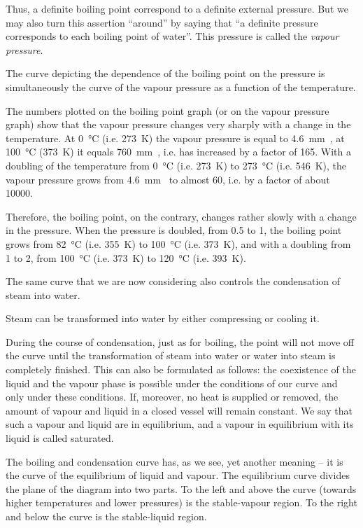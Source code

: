Thus, a definite boiling point correspond to a definite external pressure. But we may also turn this assertion ``around'' by saying that ``a definite pressure corresponds to each boiling point of water''. This pressure is called the \emph{vapour pressure}.

The curve depicting the dependence of the boiling point on the pressure is simultaneously the curve of the vapour pressure as a function of the temperature.

The numbers plotted on the boiling point graph (or on the vapour pressure graph) show that the vapour pressure changes very sharply with a change in the temperature. At \SI{0}{\celsius} (i.e. \SI{273}{\kelvin}) the vapour pressure is equal to \SI{4.6}{\milli\meter\mercury}, at \SI{100}{\celsius} (\SI{373}{\kelvin}) it equals \SI{760}{\milli\meter\mercury}, i.e. has increased by a factor of 165. With a doubling of the temperature from \SI{0}{\celsius} (i.e. \SI{273}{\kelvin}) to \SI{273}{\celsius} (i.e. \SI{546}{\kelvin}), the vapour pressure grows from \SI{4.6}{\milli\meter\mercury}  to almost \SI{60}{\atmos}, i.e. by a factor of about \num{10000}.

Therefore, the boiling point, on the contrary, changes rather slowly with a change in the pressure. When the pressure is doubled, from 0.5 to \SI{1}{\atmos}, the boiling point grows from \SI{82}{\celsius} (i.e. \SI{355}{\kelvin}) to \SI{100}{\celsius} (i.e. \SI{373}{\kelvin}), and with a doubling from 1 to \SI{2}{\atmos}, from \SI{100}{\celsius} (i.e. \SI{373}{\kelvin}) to \SI{120}{\celsius} (i.e. \SI{393}{\kelvin}).

The same curve that we are now considering also con­trols the condensation of steam into water.

Steam can be transformed into water by either compress­ing or cooling it.

During the course of condensation, just as for boiling, the point will not move off the curve until the transfor­mation of steam into water or water into steam is com­pletely finished. This can also be formulated as follows: the coexistence of the liquid and the vapour phase is pos­sible under the conditions of our curve and only under these conditions. If, moreover, no heat is supplied or removed, the amount of vapour and liquid in a closed vessel will remain constant. We say that such a vapour and liquid are in equilibrium, and a vapour in equilibrium with its liquid is called saturated.

The boiling and condensation curve has, as we see, yet another meaning -- it is the curve of the equilibrium of liquid and vapour. The equilibrium curve divides the plane of the diagram into two parts. To the left and above the curve (towards higher temperatures and lower pres­sures) is the stable-vapour region. To the right and below the curve is the stable-liquid region.

